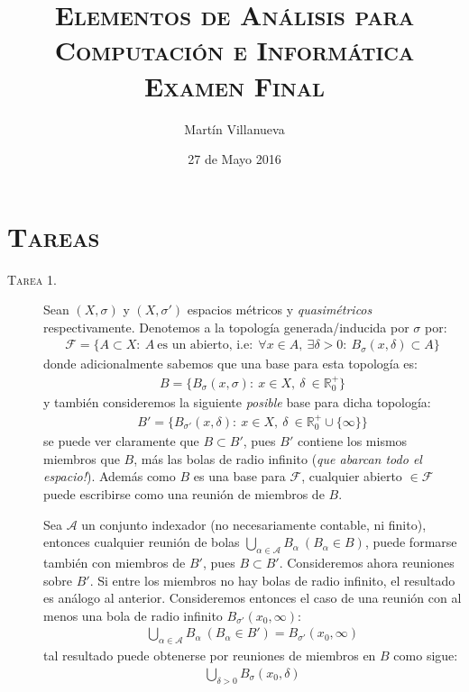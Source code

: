 \documentclass[spanish, fleqn]{article}
\title{\textsc{Elementos de Análisis para Computación e Informática} \\
	\textsc{Examen Final}}
\author{Martín Villanueva}
\date{27 de Mayo 2016}
\begin{document}
\maketitle


\section*{\textsc{Tareas}}


\begin{description}

	\item[\textsc{Tarea 1.}] Sean $(X , \sigma)$ y $(X, \sigma')$ espacios métricos y \textit{quasimétricos} respectivamente. Denotemos a la topología generada/inducida por $\sigma$ por:
	\begin{align*}
		\mathcal{F} = \{ A \subset X: \ A \ \text{es un abierto, i.e:} \ \ \forall x \in A, \ \exists \delta>0: \ B_{\sigma}(x,\delta) \subset A \}
	\end{align*}
	donde adicionalmente sabemos que una base para esta topología es:
	\begin{align*}
		B = \{ B_{\sigma}(x, \sigma): \ x \in X, \ \delta \ \in \mathbb{R}_{0}^{+}  \}
	\end{align*}
	y también consideremos la siguiente \textit{posible} base para dicha topología:
	\begin{align*}
		B' = \{ B_{\sigma'}(x,\delta): \ x \in X, \ \delta \ \in  \mathbb{R}_{0}^{+} \cup \{ \infty \} \}
	\end{align*}
	se puede ver claramente que $B \subset B'$, pues $B'$ contiene los mismos miembros que $B$, más las bolas de radio infinito (\textit{que abarcan todo el espacio!}). Además como $B$ es una base para $\mathcal{F}$, cualquier abierto $\in \mathcal{F}$ puede escribirse como una reunión de miembros de $B$.

	Sea $\mathcal{A}$ un conjunto indexador (no necesariamente contable, ni finito), entonces cualquier reunión de bolas \newline $ \bigcup_{\alpha \in \mathcal{A}} B_{\alpha}  \ (B_{\alpha} \in B)$, puede formarse también con miembros de $B'$, pues $B \subset B'$. 
	Consideremos ahora reuniones sobre $B'$. Si entre los miembros no hay bolas de radio infinito, el resultado es análogo 
	al anterior. Consideremos entonces el caso de una reunión con al menos una bola de radio infinito $B_{\sigma'}(x_0, \infty)$:
	\begin{align*}
		\bigcup_{\alpha \in \mathcal{A}} B_{\alpha} \ (B_{\alpha} \in B') = B_{\sigma'}(x_0, \infty)
	\end{align*}
	tal resultado puede obtenerse por reuniones de miembros en $B$ como sigue:
	\begin{align*}
		\bigcup_{\delta > 0} B_{\sigma}(x_0, \delta)
	\end{align*}


\end{description}
\end{document}
